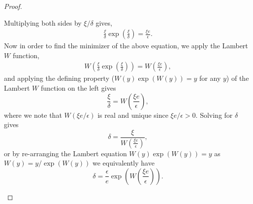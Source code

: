 \documentclass[10pt,a4paper]{amsart}
\begin{document}
\begin{proof}
\begin{itemize}
Multiplying both sides by $\xi/\delta$ gives,
\begin{align*}
 \frac{\xi}{\delta}\exp\left(\frac{\xi}{\delta}\right) = \frac{\xi e}{\epsilon}.
\end{align*}
Now in order to find the minimizer of the above equation, we apply the Lambert $W$ function,
\begin{align*}
 W\left(\frac{\xi}{\delta}\exp\left(\frac{\xi}{\delta}\right)\right) = W\left(\frac{\xi e}{\epsilon}\right),
\end{align*}
and applying the defining property ($W(y)\exp(W(y)) = y$ for any $y$) of the Lambert $W$ function on the left gives
\[
\frac{\xi}{\delta} = W\left(\frac{\xi e}{\epsilon}\right),
\]
where we note that $W(\xi e/\epsilon)$ is real and unique since $\xi e/\epsilon > 0$. Solving for $\delta$ gives
\[
\delta = \frac{\xi}{W(\frac{\xi e}{\epsilon})},
\]
or by re-arranging the Lambert equation $W(y)\exp(W(y)) = y$ as $W(y) = y/\exp(W(y))$ we equivalently have
\[
\delta = \frac{\epsilon}{e}\exp\left(W\left(\frac{\xi e}{\epsilon}\right)\right).
\]
\end{itemize}
\end{proof}
\end{document}
